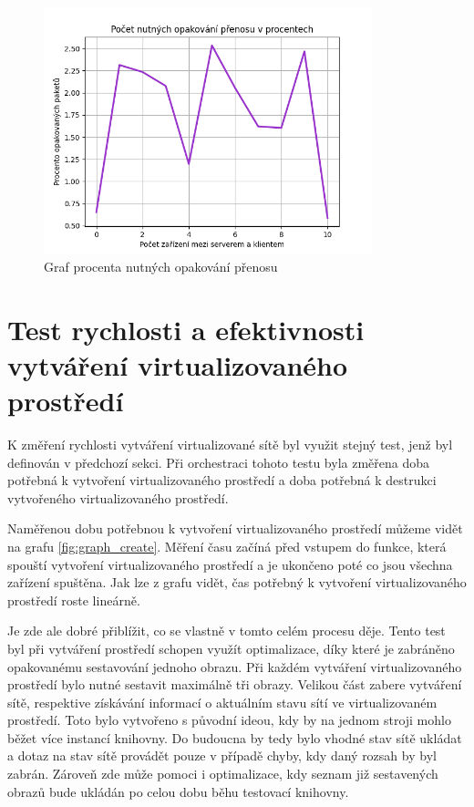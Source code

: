 \begin{figure}[H]
    \centering 
    \includegraphics[width=0.85\textwidth]{assets/img/graphs/retransmissions.png}
    \caption{Graf procenta nutných opakování přenosu}
    \label{fig:graph_retransmissions}
\end{figure}


\section{Test rychlosti a efektivnosti vytváření virtualizovaného prostředí}

K změření rychlosti vytváření virtualizované sítě byl využit stejný test, jenž byl definován v předchozí sekci. Při orchestraci tohoto testu byla změřena doba potřebná k vytvoření virtualizovaného prostředí a doba potřebná k destrukci vytvořeného virtualizovaného prostředí. 

Naměřenou dobu potřebnou k vytvoření virtualizovaného prostředí můžeme vidět na grafu \ref{fig:graph_create}. Měření času začíná před vstupem do funkce, která spouští vytvoření virtualizovaného prostředí a je ukončeno poté co jsou všechna zařízení spuštěna. Jak lze z grafu vidět, čas potřebný k vytvoření virtualizovaného prostředí roste lineárně. 

Je zde ale dobré přiblížit, co se vlastně v tomto celém procesu děje. Tento test byl při vytváření prostředí schopen využít optimalizace, díky které je zabráněno opakovanému sestavování jednoho obrazu. Při každém vytváření virtualizovaného prostředí bylo nutné sestavit maximálně tři obrazy. Velikou část zabere vytváření sítě, respektive získávání informací o aktuálním stavu sítí ve virtualizovaném prostředí. Toto bylo vytvořeno s původní ideou, kdy by na jednom stroji mohlo běžet více instancí knihovny. Do budoucna by tedy bylo vhodné stav sítě ukládat a dotaz na stav sítě provádět pouze v případě chyby, kdy daný rozsah by byl zabrán. Zároveň zde může pomoci i optimalizace, kdy seznam již sestavených obrazů bude ukládán po celou dobu běhu testovací knihovny.

